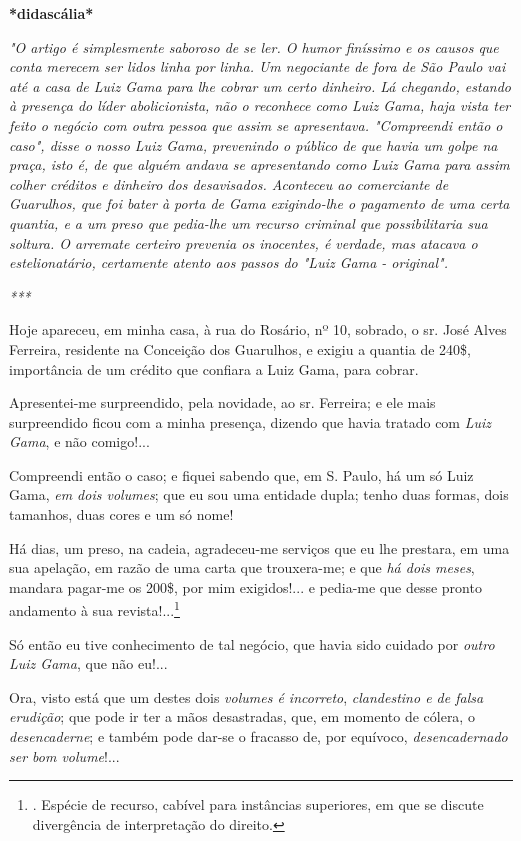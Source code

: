 \textbf{*didascália*}

\emph{"O artigo é simplesmente saboroso de se ler. O humor finíssimo e
os causos que conta merecem ser lidos linha por linha. Um negociante de
fora de São Paulo vai até a casa de Luiz Gama para lhe cobrar um certo
dinheiro. Lá chegando, estando à presença do líder abolicionista, não o
reconhece como Luiz Gama, haja vista ter feito o negócio com outra
pessoa que assim se apresentava. "Compreendi então o caso", disse o
nosso Luiz Gama, prevenindo o público de que havia um golpe na praça,
isto é, de que alguém andava se apresentando como Luiz Gama para assim
colher créditos e dinheiro dos desavisados. Aconteceu ao comerciante de
Guarulhos, que foi bater à porta de Gama exigindo-lhe o pagamento de uma
certa quantia, e a um preso que pedia-lhe um recurso criminal que
possibilitaria sua soltura. O arremate certeiro prevenia os inocentes, é
verdade, mas atacava o estelionatário, certamente atento aos passos do
"Luiz Gama - original". }

\emph{***}

Hoje apareceu, em minha casa, à rua do Rosário, nº 10, sobrado, o sr.
José Alves Ferreira, residente na Conceição dos Guarulhos, e exigiu a
quantia de 240\$, importância de um crédito que confiara a Luiz Gama,
para cobrar.

Apresentei-me surpreendido, pela novidade, ao sr. Ferreira; e ele mais
surpreendido ficou com a minha presença, dizendo que havia tratado com
\emph{Luiz Gama}, e não comigo!...

Compreendi então o caso; e fiquei sabendo que, em S. Paulo, há um só
Luiz Gama, \emph{em dois volumes}; que eu sou uma entidade dupla; tenho
duas formas, dois tamanhos, duas cores e um só nome!

Há dias, um preso, na cadeia, agradeceu-me serviços que eu lhe prestara,
em uma sua apelação, em razão de uma carta que trouxera-me; e que
\emph{há dois meses}, mandara pagar-me os 200\$, por mim exigidos!... e
pedia-me que desse pronto andamento à sua revista!...\footnote{. Espécie
  de recurso, cabível para instâncias superiores, em que se discute
  divergência de interpretação do direito.}

Só então eu tive conhecimento de tal negócio, que havia sido cuidado por
\emph{outro} \emph{Luiz Gama}, que não eu!...

Ora, visto está que um destes dois \emph{volumes é incorreto},
\emph{clandestino e de falsa erudição}; que pode ir ter a mãos
desastradas, que, em momento de cólera, o \emph{desencaderne}; e também
pode dar-se o fracasso de, por equívoco, \emph{desencadernado ser bom
volume}!...


